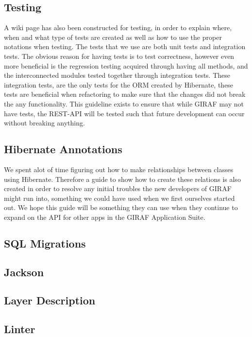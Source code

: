 \subsection{Testing}
A wiki page has also been constructed for testing, in order to explain where, when and what type of tests are created as well as how to use the proper notations when testing.
The tests that we use are both unit tests and integration tests.
The obvious reason for having tests is to test correctness, however even more beneficial is the regression testing acquired through having all methods, and the interconnected modules tested together through integration tests.
These integration tests, are the only tests for the ORM created by Hibernate, these tests are beneficial when refactoring to make sure that the changes did not break the any functionality.
This guideline exists to ensure that while GIRAF may not have tests, the REST-API will be tested such that future development can occur without breaking anything.

\subsection{Hibernate Annotations}
We spent alot of time figuring out how to make relationships between classes using Hibernate.
Therefore a guide to show how to create these relations is also created in order to resolve any initial troubles the new developers of GIRAF might run into, something we could have used when we first ourselves started out.
We hope this guide will be something they can use when they continue to expand on the API for other apps in the GIRAF Application Suite.

\subsection{SQL Migrations}
\subsection{Jackson}
\subsection{Layer Description}
\subsection{Linter}
